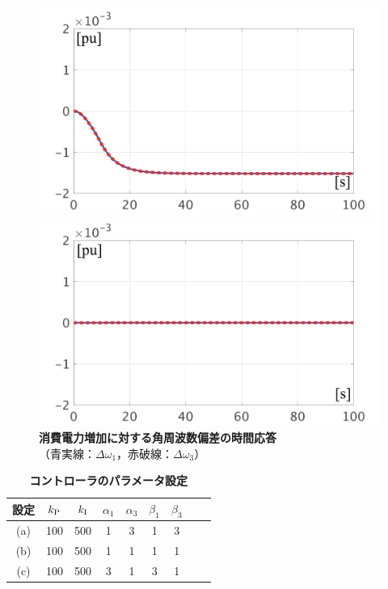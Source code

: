 \documentclass[tombow,dvipdfmx]{corona-a5-1.1}
\begin{document}
\begin{figure}[t]
  \centering
  {
  \begin{minipage}{0.49\linewidth}
    \centering
    \includegraphics[width = 1.0\linewidth]{figs/woagcPinc}
  \end{minipage}
  \begin{minipage}{0.49\linewidth}
    \centering
    \includegraphics[width = 1.0\linewidth]{figs/wagcPinc}
  \end{minipage}
  \medskip
  \caption{\textbf{消費電力増加に対する角周波数偏差の時間応答} 
    \\ \centering（青実線：$\Delta \omega_1$，赤破線：$\Delta \omega_3$）}
  \label{fig:agcPdemo}
  }
\medskip
\end{figure}

\begin{table}[h]
\medskip
 \caption{\textbf{コントローラのパラメータ設定}}
 \label{table:agcpara}
 \centering
  \begin{tabular}{ccccccccc}
   \hline
設定 &  $k_{\rm P}$ & $k_{\rm I}$ & $\alpha_1$ & $\alpha_3$ &$\beta_1$ & $\beta_3$ \\
   \hline \hline
(a) & 100 & 500 & 1 & 3 & 1 & 3 \\
(b) & 100 & 500 & 1 & 1& 1 & 1 \\
(c) & 100 & 500 & 3 & 1 & 3 & 1 \\
   \hline
  \end{tabular}
\end{table}
\end{document}
